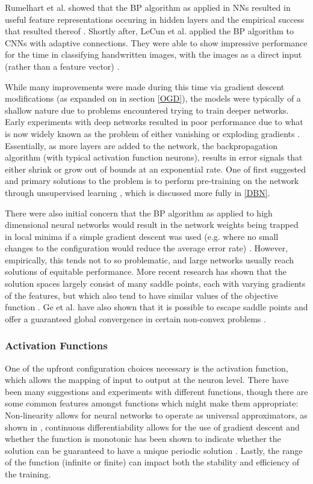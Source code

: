 \documentclass[a4paper,latin]{paper}
\begin{document}
Rumelhart et al. showed that the BP algorithm as applied in NNs resulted in useful feature representations 
occuring in hidden layers and the empirical success that resulted thereof \cite{Rumelhart}.  
Shortly after, LeCun et al. applied the BP algorithm to CNNs with adaptive connections. They were able to show 
impressive performance for the time in classifying handwritten images, with the images as a direct input (rather than a feature vector) \cite{LeCun3}.
\hfill \break 

While many improvements were made during this time via gradient descent modifications (as expanded on in section \ref{OGD}), the 
models were typically of a shallow nature due to problems encountered trying to train deeper networks. 
Early experiments with deep networks resulted in poor performance due to what is now widely known as the problem 
of either vanishing or exploding gradients \cite{Pascanu}. Essentially, as more layers are added to the network, the backpropagation 
algorithm (with typical activation function neurons), results in error signals that either shrink or grow out of bounds at an 
exponential rate. One of first suggested and primary solutions to the problem is to perform pre-training on the 
network through unsupervised learning  \cite{Schmidhuber}, which is discussed more fully in \ref{DBN}.
\hfill \break 

There were also initial concern that the BP algorithm as applied to high dimensional neural networks would result 
in the network weights being trapped in local minima if a simple gradient descent was used (e.g. where no small 
changes to the configuration would reduce the average error rate) \cite{LeCun4}. 
However, empirically, this tends not to so problematic, and large networks usually reach solutions of equitable 
performance. More recent research has shown that the solution spaces largely consist of many saddle points, each 
with varying gradients of the features, but which also tend to have similar values of the objective function \cite{Dauphin}. 
Ge et al. have also shown that it is possible to escape saddle points and offer a guaranteed global convergence 
in certain non-convex problems \cite{Ge}.
\hfill \break 

\subsubsection{Activation Functions}\label{lr_activationfunctions}

One of the upfront configuration choices necessary is the activation function, which allows the mapping of input 
to output at the neuron level. There have been many suggestions and experiments with different functions, though 
there are some common features amongst functions which might make them appropriate: Non-linearity allows for 
neural networks to operate as universal approximators, as shown in \cite{Hornik}, continuous differentiability allows for the 
use of gradient descent and whether the function is monotonic has been shown to indicate whether the solution 
can be guaranteed to have a unique periodic solution \cite{Wu}. Lastly, the range of the function (infinite or finite) can impact both the 
stability and efficiency of the training.
\hfill \break 
\end{document}
